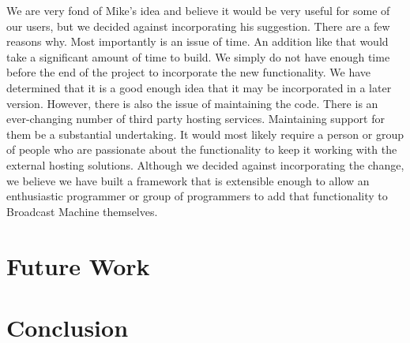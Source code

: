 \documentclass[a4paper,12pt]{report}
\begin{document}
We are very fond of Mike's idea and believe it would be very useful for some of our users, but we decided against 
incorporating his suggestion. 
There are a few reasons why. 
Most importantly is an issue of time. 
An addition like that would take a significant amount of time to build. 
We simply do not have enough time before the end of the project to incorporate the new functionality. 
We have determined that it is a good enough idea that it may be incorporated in a later version. 
However, there is also the issue of maintaining the code. 
There is an ever-changing number of third party hosting services. 
Maintaining support for them be a substantial undertaking. 
It would most likely require a person or group of people who are passionate about the functionality to keep it working 
with the external hosting solutions. 
Although we decided against incorporating the change, we believe we have built a framework that is extensible enough to 
allow an enthusiastic programmer or group of programmers to add that functionality to Broadcast Machine themselves.

\chapter{Future Work}


\chapter{Conclusion}
\end{document}
